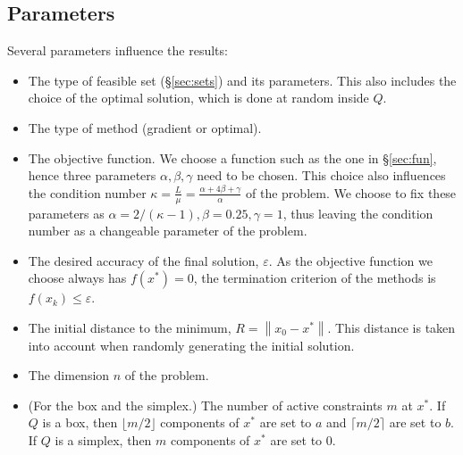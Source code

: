 \documentclass[final]{aomart}
\newtheorem[{}\it]{thm}{Theorem}[section]
\theoremstyle{definition}
\newtheorem*[{}\it]{notation}{Notation}
\numberwithin{equation}{section}
\newcommand{\secref}[1]{\S\ref{#1}}
\renewcommand{\epsilon}{\varepsilon}
\newcommand{\enVert}[1]{\left\lVert#1\right\rVert}
\let\norm=\enVert
\begin{document}
\subsection{Parameters}
Several parameters influence the results:
\begin{itemize}
	\item The type of feasible set (\secref{sec:sets}) and its parameters.
	This also includes the choice of the optimal solution, which is done at random inside \(Q\).
	\item The type of method (gradient or optimal).
	\item The objective function.
	We choose a function such as the one in \secref{sec:fun}, hence three parameters \(\alpha, \beta, \gamma\) need to be chosen.
	This choice also influences the condition number \(\kappa = \frac{L}{\mu} = \frac{\alpha + 4\beta + \gamma}{\alpha}\) of the problem.
	We choose to fix these parameters as \(\alpha = 2/(\kappa - 1), \beta = 0.25, \gamma = 1\), thus leaving the condition number as a changeable parameter of the problem.
	\item The desired accuracy of the final solution, \(\epsilon\).
	As the objective function we choose always has \(f(x^*) = 0\), the termination criterion of the methods is \(f(x_k) \leqslant \epsilon\).
	\item The initial distance to the minimum, \(R = \norm{x_0 - x^*}\).
	This distance is taken into account when randomly generating the initial solution.
	\item The dimension \(n\) of the problem.
	\item (For the box and the simplex.) The number of active constraints \(m\) at \(x^*\).
	If \(Q\) is a box, then \(\lfloor m/2 \rfloor\) components of \(x^*\) are set to \(a\) and \(\lceil m/2 \rceil\) are set to \(b\).
	If \(Q\) is a simplex, then \(m\) components of \(x^*\) are set to \(0\).
\end{itemize}
\end{document}
